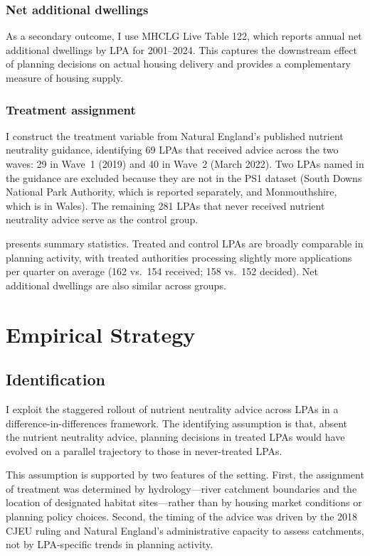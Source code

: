 \documentclass[12pt]{article}
\begin{document}
\subsubsection*{Net additional dwellings} As a secondary outcome, I use MHCLG Live Table 122, which reports annual net additional dwellings by LPA for 2001--2024. This captures the downstream effect of planning decisions on actual housing delivery and provides a complementary measure of housing supply.

\subsubsection*{Treatment assignment} I construct the treatment variable from Natural England's published nutrient neutrality guidance, identifying 69 LPAs that received advice across the two waves: 29 in Wave~1 (2019) and 40 in Wave~2 (March 2022). Two LPAs named in the guidance are excluded because they are not in the PS1 dataset (South Downs National Park Authority, which is reported separately, and Monmouthshire, which is in Wales). The remaining 281 LPAs that never received nutrient neutrality advice serve as the control group.



 presents summary statistics. Treated and control LPAs are broadly comparable in planning activity, with treated authorities processing slightly more applications per quarter on average (162 vs.\ 154 received; 158 vs.\ 152 decided). Net additional dwellings are also similar across groups.

\section{Empirical Strategy}
\label{sec:strategy}

\subsection{Identification}

I exploit the staggered rollout of nutrient neutrality advice across LPAs in a difference-in-differences framework. The identifying assumption is that, absent the nutrient neutrality advice, planning decisions in treated LPAs would have evolved on a parallel trajectory to those in never-treated LPAs.

This assumption is supported by two features of the setting. First, the assignment of treatment was determined by hydrology---river catchment boundaries and the location of designated habitat sites---rather than by housing market conditions or planning policy choices. Second, the timing of the advice was driven by the 2018 CJEU ruling and Natural England's administrative capacity to assess catchments, not by LPA-specific trends in planning activity.
\end{document}
